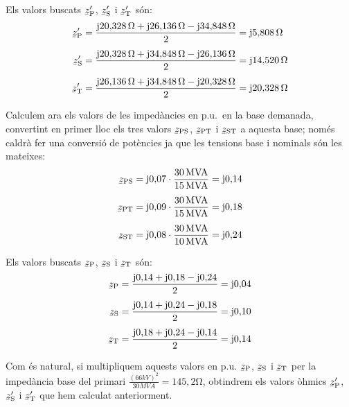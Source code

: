 \begin{exemple}
    Els valors buscats $\cmplx{z}\ped{P}'$, $\cmplx{z}\ped{S}'$ i $\cmplx{z}\ped{T}'$ s\'{o}n:
    \begin{align*}
        \cmplx{z}\ped{P}' &=  \frac{\ju 20{,}328\unit{\ohm} + \ju 26{,}136\unit{\ohm} - \ju 34{,}848\unit{\ohm}}{2} = \ju 5{,}808\unit{\ohm} \\[1ex]
        \cmplx{z}\ped{S}' &=  \frac{\ju 20{,}328\unit{\ohm} + \ju 34{,}848\unit{\ohm} - \ju 26{,}136\unit{\ohm}}{2} = \ju 14{,}520\unit{\ohm} \\[1ex]
        \cmplx{z}\ped{T}' &=  \frac{\ju 26{,}136\unit{\ohm} + \ju 34{,}848\unit{\ohm} - \ju 20{,}328\unit{\ohm}}{2} = \ju 20{,}328\unit{\ohm}
    \end{align*}

    Calculem ara els valors de les imped\`{a}ncies en p.u.\ en la base demanada, convertint en primer lloc els tres valors $\cmplx{z}\ped{PS}$, $\cmplx{z}\ped{PT}$ i $\cmplx{z}\ped{ST}$ a aquesta base; nom\'{e}s caldr\`{a} fer una conversi\'{o} de pot\`{e}ncies ja que les tensions base i nominals s\'{o}n les mateixes:
    \begin{align*}
        \cmplx{z}\ped{PS} &=  \ju 0{,}07 \cdot \frac{30\unit{MVA}}{15\unit{MVA}} = \ju 0{,}14\\[1ex]
        \cmplx{z}\ped{PT} &=  \ju 0{,}09 \cdot \frac{30\unit{MVA}}{15\unit{MVA}} = \ju 0{,}18\\[1ex]
        \cmplx{z}\ped{ST} &=  \ju 0{,}08 \cdot \frac{30\unit{MVA}}{10\unit{MVA}} = \ju 0{,}24
    \end{align*}

    Els valors buscats $\cmplx{z}\ped{P}$, $\cmplx{z}\ped{S}$ i $\cmplx{z}\ped{T}$ s\'{o}n:
    \begin{align*}
        \cmplx{z}\ped{P} &=  \frac{\ju 0{,}14 + \ju 0{,}18 - \ju 0{,}24}{2} = \ju 0{,}04 \\[1ex]
        \cmplx{z}\ped{S} &=  \frac{\ju 0{,}14 + \ju 0{,}24 - \ju 0{,}18}{2} = \ju 0{,}10 \\[1ex]
        \cmplx{z}\ped{T} &=  \frac{\ju 0{,}18 + \ju 0{,}24 - \ju 0{,}14}{2} = \ju 0{,}14
    \end{align*}

     Com \'{e}s natural, si multipliquem aquests valors en p.u.  $\cmplx{z}\ped{P}$, $\cmplx{z}\ped{S}$ i $\cmplx{z}\ped{T}$ per la imped\`{a}ncia base del primari $\frac{(66\unit{kV})^2}{30\unit{MVA}}=145{,}2\unit{\ohm}$, obtindrem els valors \`{o}hmics $\cmplx{z}\ped{P}'$,     $\cmplx{z}\ped{S}'$ i $\cmplx{z}\ped{T}'$ que hem calculat anteriorment.

\end{exemple}


